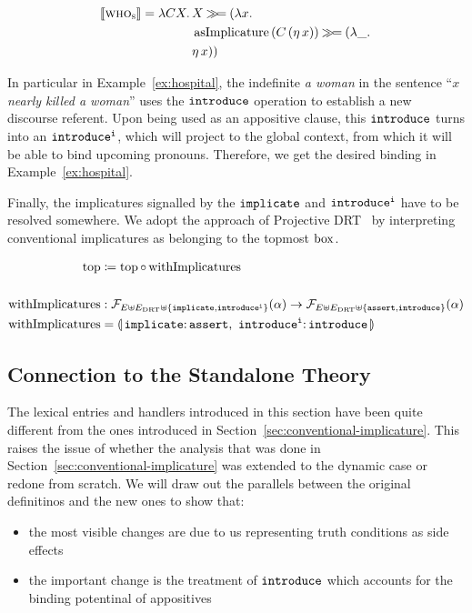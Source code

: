 $$
\llbracket \textsc{who}_{\textsc{s}} \rrbracket = \lambda C X.\, \begin{aligned}[t]
    &X \mathbin{\gg\!=} (\lambda x.\,  \\
    &\operatorname{asImplicature}\,(C\,(\eta\,x)) \mathbin{\gg\!=} (\lambda \_.\,  \\
    &\eta\,x))
  \end{aligned}
$$

In particular in Example~\ref{ex:hospital}, the indefinite \emph{a woman}
in the sentence ``\emph{$x$ nearly killed a woman}'' uses the
$\mathtt{introduce}$ operation to establish a new discourse referent. Upon
being used as an appositive clause, this $\mathtt{introduce}$ turns into an
$\mathtt{introduce^i}$, which will project to the global context, from which it
will be able to bind upcoming pronouns. Therefore, we get the desired
binding in Example~\ref{ex:hospital}.

Finally, the implicatures signalled by the $\mathtt{implicate}$ and
$\mathtt{introduce^i}$ have to be resolved somewhere. We adopt the approach of
Projective DRT~\cite{venhuizen2013parsimonious} by interpreting
conventional implicatures as belonging to the topmost $\mathrm{box}$.

\begin{align*}
  \TOP &\coloneqq \TOP \circ \withImplicatures \\
  \\
  \withImplicatures &: \FF_{E \uplus E_\DRT \uplus \{\op{implicate},\op{introduce^i}\}}(\alpha) \to
                       \FF_{E \uplus E_\DRT \uplus \{\op{assert},\op{introduce}\}}(\alpha) \\
  \withImplicatures &= \banana{\onto{\op{implicate}}{\op{assert}},\
                               \onto{\op{introduce^i}}{\op{introduce}}}
\end{align*}


\subsection{Connection to the Standalone Theory}

The lexical entries and handlers introduced in this section have been
quite different from the ones introduced in
Section~\ref{sec:conventional-implicature}. This raises the issue of
whether the analysis that was done in
Section~\ref{sec:conventional-implicature} was extended to the dynamic case
or redone from scratch. We will draw out the parallels between the
original definitinos and the new ones to show that:

\begin{itemize}
\item the most visible changes are due to us representing truth conditions
  as side effects
\item the important change is the treatment of $\mathtt{introduce}$ which
  accounts for the binding potentinal of appositives
\end{itemize}


